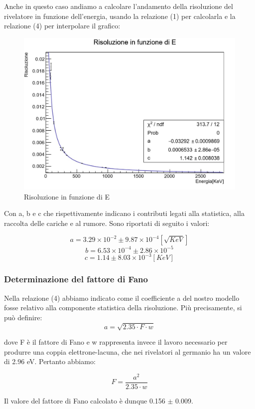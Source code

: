\documentclass[a4paper,10pt]{article}
\begin{document}
Anche in questo caso andiamo a calcolare l'andamento della risoluzione del rivelatore in funzione dell'energia, usando la relazione (1) per calcolarla e la relazione (4) per interpolare il grafico:

\begin{figure}[H]
    \centering
    \includegraphics[scale=0.45]{grafici/risoluzioneignota}
    \caption{Risoluzione in funzione di E}
\end{figure}

Con a, b e c che rispettivamente indicano i contributi legati alla statistica, alla raccolta delle cariche e al rumore. Sono riportati di seguito i valori:

$$
	a=3.29 \times 10^{-2} \pm 9.87 \times 10^{-4} [\sqrt{KeV}]
$$
$$
	b=6.53 \times 10^{-4} \pm 2.86 \times 10^{-5}
$$
$$
	c= 1.14 \pm 8.03 \times 10^{-3} [KeV]
$$

\subsubsection{Determinazione del fattore di Fano}

Nella relazione (4) abbiamo indicato come il coefficiente a del nostro modello fosse relativo alla componente statistica della risoluzione. Più precisamente, si può definire:
$$
	a=\sqrt{2.35 \cdot F \cdot w}
$$

dove F è il fattore di Fano e w rappresenta invece il lavoro necessario per produrre una coppia elettrone-lacuna, che nei rivelatori al germanio ha un valore di 2.96 eV. Pertanto abbiamo:

$$
	F=\frac{a^2}{2.35 \cdot w}
$$

Il valore del fattore di Fano calcolato è dunque 0.156 $\pm$ 0.009.
\end{document}
